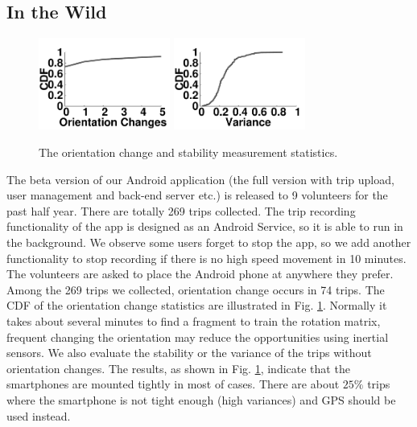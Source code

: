\subsection{In the Wild}



\begin{figure}[!htbp]
\begin{center}
\includegraphics[width=1.7in,angle=0]{Figs/DriveSense/evaluation/wild_changes.pdf}
\hspace{-0.5cm}
\includegraphics[width=1.7in,angle=0]{Figs/DriveSense/evaluation/wild_variances.pdf}
\vspace{0.0cm}
\caption{The orientation change and stability measurement statistics.}
\vspace{-0.2cm}
\label{wild_evaluation}
\end{center}
\end{figure}


The beta version of our Android application (the full version with 
trip upload, user management and back-end server etc.) is released to
9 volunteers for the past half year. 
There are totally 269 trips collected. 
The trip recording functionality of the app is designed as an Android 
Service, so it is able to run in the background. 
We observe some users forget to stop the app, 
so we add another functionality to stop recording if there
is no high speed movement in 10 minutes. 
The volunteers are asked to place the Android phone
at anywhere they prefer. 
Among the 269 trips we collected, 
orientation change occurs in 74 trips. 
The CDF of the orientation change statistics are 
illustrated in Fig. \ref{wild_evaluation}.
Normally it takes about several minutes to find a fragment
to train the rotation matrix, frequent changing 
the orientation may reduce the opportunities using
inertial sensors. 
We also evaluate the stability or the variance of the trips 
without orientation changes. 
The results, as shown in Fig. \ref{wild_evaluation}, 
indicate that the smartphones are mounted tightly
in most of cases. 
There are about $25\%$ trips where the smartphone is not 
tight enough (high variances) and GPS should be used instead. 


